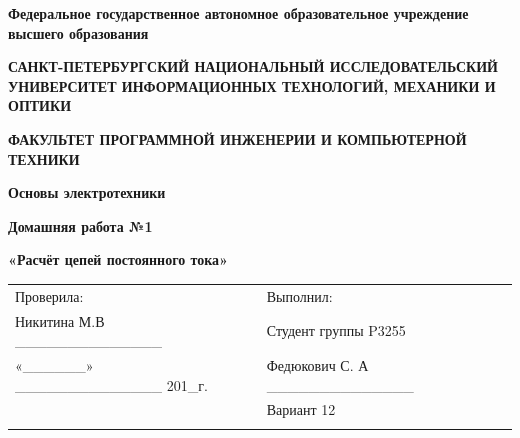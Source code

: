 \documentclass[12pt]{article}
\begin{document}
	\pagestyle{empty}
	\begin{center}
		\normalsize
		\textbf{Федеральное государственное автономное образовательное учреждение высшего образования}

		\small
		\medskip 
		\textbf{САНКТ-ПЕТЕРБУРГСКИЙ НАЦИОНАЛЬНЫЙ ИССЛЕДОВАТЕЛЬСКИЙ  УНИВЕРСИТЕТ ИНФОРМАЦИОННЫХ ТЕХНОЛОГИЙ, МЕХАНИКИ И ОПТИКИ}

		\medskip 
		\textbf{ФАКУЛЬТЕТ ПРОГРАММНОЙ ИНЖЕНЕРИИ И КОМПЬЮТЕРНОЙ ТЕХНИКИ}
	\end{center}
	\bigskip\bigskip\bigskip\bigskip\bigskip\bigskip\bigskip\bigskip\bigskip\bigskip\bigskip\bigskip
	\begin{center}
		\par\medskip\par\smallskip
		\Large
 
		\par\smallskip
		\textbf{Основы электротехники} 

		\textbf{Домашняя работа №1}

		\large
		\par\bigskip
		\textbf{«Расчёт цепей постоянного тока»}
		\par\bigskip\par\bigskip\par\bigskip\par\bigskip\par\bigskip\par\bigskip
		\par\bigskip\par\bigskip\par\bigskip\par\bigskip\par\bigskip\par\bigskip
		\par\bigskip\par\bigskip\par\bigskip\par\bigskip\par\bigskip\par\bigskip
	\end{center}
	\begin{center}
		\begin{tabular}{lllll}
			Проверила:	 							& \hspace{80pt}	&	Выполнил:								&\\
			Никитина М.В	 \_\_\_\_\_\_\_\_\_\_\_\_\_\_		&			&	Студент группы P3255					&\\
			«\_\_\_\_\_\_» 	\_\_\_\_\_\_\_\_\_\_\_\_\_\_ 201\_г.	& 			&	Федюкович С. А \_\_\_\_\_\_\_\_\_\_\_\_\_\_	&\\
													&			&	Вариант 12							&\\
													&			&										&\\
		\end{tabular}
		\par\bigskip\par\bigskip\par\bigskip
                                                  
		\par\bigskip \par\bigskip
	\end{center}
\end{document}
